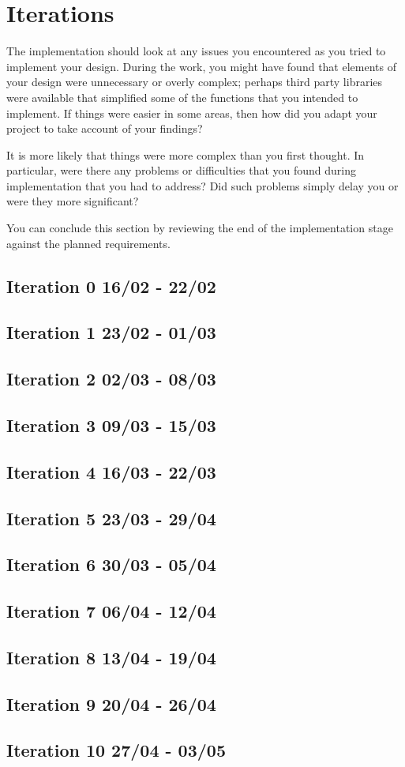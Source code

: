 \chapter{Iterations}

The implementation should look at any issues you encountered as you tried to implement your design. During the work, you might have found that elements of your design were unnecessary or overly complex; perhaps third party libraries were available that simplified some of the functions that you intended to implement. If things were easier in some areas, then how did you adapt your project to take account of your findings?

It is more likely that things were more complex than you first thought. In particular, were there any problems or difficulties that you found during implementation that you had to address? Did such problems simply delay you or were they more significant? 

You can conclude this section by reviewing the end of the implementation stage against the planned requirements. 

\section{Iteration 0 16/02 - 22/02}
\section{Iteration 1 23/02 - 01/03}
\section{Iteration 2 02/03 - 08/03}
\section{Iteration 3 09/03 - 15/03}
\section{Iteration 4 16/03 - 22/03}
\section{Iteration 5 23/03 - 29/04}
\section{Iteration 6 30/03 - 05/04}
\section{Iteration 7 06/04 - 12/04}
\section{Iteration 8 13/04 - 19/04}
\section{Iteration 9 20/04 - 26/04}
\section{Iteration 10 27/04 - 03/05}